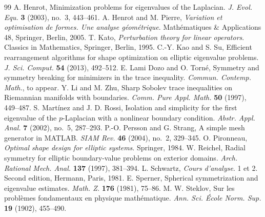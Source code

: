 \documentclass[11pt]{amsart}
\theoremstyle{remark}
\numberwithin{equation}{section}
\begin{document}
\begin{thebibliography}{99}
 A. Henrot, Minimization problems for eigenvalues of the Laplacian. \emph{J. Evol. Equ.} \textbf{3} (2003), no.~3, 443--461.
 A. Henrot and M. Pierre, \emph{Variation et optimisation de formes. Une analyse géométrique}. Mathématiques \& Applications 48, Springer, Berlin, 2005.
 T. Kato, \emph{Perturbation theory for linear operators}. Classics in Mathematics, Springer, Berlin, 1995.
 C.-Y. Kao and S. Su, Efficient rearrangement algorithms for shape optimization on elliptic eigenvalue problems. \emph{J. Sci. Comput.} \textbf{54} (2013), 492--512.
 E. Lami Dozo and O. Torné, Symmetry and symmetry breaking for minimizers in the trace inequality. \emph{Commun. Contemp. Math.}, to appear.
 Y. Li and M. Zhu, Sharp Sobolev trace inequalities on Riemannian manifolds with boundaries. \emph{Comm. Pure Appl. Math.} \textbf{50} (1997), 449--487.
 S. Martínez and J. D. Rossi, Isolation and simplicity for the first eigenvalue of the $p$-Laplacian with a nonlinear boundary condition. \emph{Abstr. Appl. Anal.} \textbf{7} (2002), no.~5, 287--293.
 P.-O. Persson and G. Strang, A simple mesh generator in MATLAB. \emph{SIAM Rev.} \textbf{46} (2004), no.~2, 329--345.
 O. Pironneau, \emph{Optimal shape design for elliptic systems}. Springer, 1984.
 W. Reichel, Radial symmetry for elliptic boundary-value problems on exterior domains. \emph{Arch. Rational Mech. Anal.} \textbf{137} (1997), 381--394.
 L. Schwartz, \emph{Cours d'analyse}. 1 et 2. Second edition, Hermann, Paris, 1981.
 E. Sperner, Spherical symmetrization and eigenvalue estimates. \emph{Math. Z.} \textbf{176} (1981), 75--86.
 M. W. Steklov, Sur les problèmes fondamentaux en physique mathématique. \emph{Ann. Sci. École Norm. Sup.} \textbf{19} (1902), 455--490.
\end{thebibliography}
\end{document}
